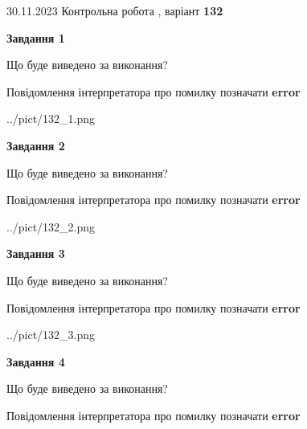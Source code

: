 \documentclass[12pt, ukrainian]{article}
\begin{document}
{{30.11.2023 Контрольна робота , варіант  \No \textbf { 132 }\par}}
{




{\begin {center}\textbf{Завдання 1}\end {center}}\par
Що буде виведено за виконання? \par
Повідомлення інтерпретатора про помилку позначати \textbf{error}

\begin{center}
	{../pict/132_1.png}
\end{center}
\newpage

{\begin {center}\textbf{Завдання 2}\end {center}}\par
Що буде виведено за виконання? \par
Повідомлення інтерпретатора про помилку позначати \textbf{error}

\begin{center}
	{../pict/132_2.png}
\end{center}
\newpage

{\begin {center}\textbf{Завдання 3}\end {center}}\par
Що буде виведено за виконання? \par
Повідомлення інтерпретатора про помилку позначати \textbf{error}

\begin{center}
	{../pict/132_3.png}
\end{center}
\newpage

{\begin {center}\textbf{Завдання 4}\end {center}}\par
Що буде виведено за виконання? \par
Повідомлення інтерпретатора про помилку позначати \textbf{error}

}
\end{document}
